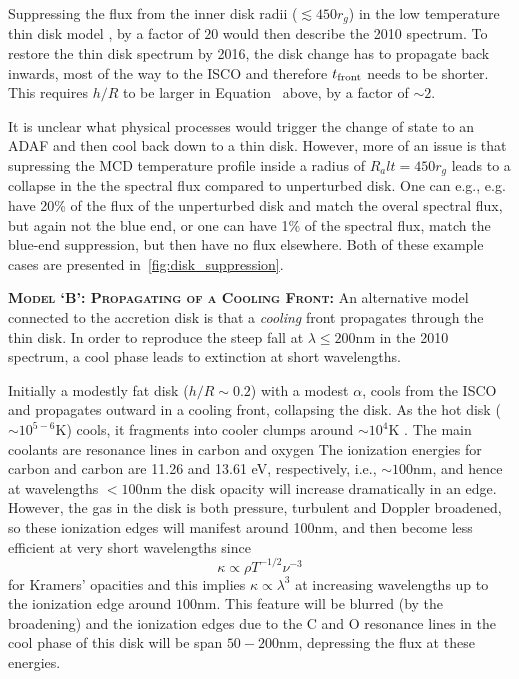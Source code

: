 \documentclass[11pt,a4paper]{article}
\begin{document}
Suppressing the flux from the inner disk radii ($\lesssim 450 r_{g}$)
in the low temperature thin disk model \citep{Narayan1997, Gammie1999,
Agol_Krolik2000, Ashfordi_Paczynski2003, Ford2018}, by a factor of
$20$ would then describe the 2010 spectrum.  To restore the thin disk
spectrum by 2016, the disk change has to propagate back inwards, most
of the way to the ISCO and therefore $t_{\rm front}$ needs to be
shorter. This requires $h/R$ to be larger in
Equation~\label{eqn:t_front} above, by a factor of $\sim 2$.

It is unclear what physical processes would trigger the change of
state to an ADAF and then cool back down to a thin disk. However, more
of an issue is that supressing the MCD temperature profile inside a
radius of $R_alt = 450 r_{g}$ leads to a collapse in the the spectral
flux compared to unperturbed disk. One can e.g., e.g. have 20\% of the
flux of the unperturbed disk and match the overal spectral flux, but
again not the blue end, or one can have 1\% of the spectral flux,
match the blue-end suppression, but then have no flux elsewhere. Both
of these example cases are presented in~\ref{fig:disk_suppression}.


\smallskip \smallskip
\noindent
\textbf{\textsc{Model `B': Propagating of a Cooling Front: }}
An alternative model connected to the accretion disk is that a
\emph{cooling} front propagates through the thin disk.  In order to
reproduce the steep fall at $\lambda \leq 200$nm in the 2010 spectrum,
a cool phase leads to extinction at short wavelengths.

Initially a modestly fat disk ($h/R \sim 0.2$) with a modest $\alpha$,
cools from the ISCO and propagates outward in a cooling front,
collapsing the disk. As the hot disk ($\sim 10^{5-6}$K) cools, it
fragments into cooler clumps around $\sim 10^{4}$K \citep[see e.g.,
][]{McCourt2016}.  The main coolants are resonance lines in carbon and
oxygen \citep[see e.g., Fig. 18 in ][]{Dopita_Sutherland1993} The
ionization energies for carbon and carbon are 11.26 and 13.61 eV,
respectively, i.e., $\sim 100$nm, and hence at wavelengths $<100$nm
the disk opacity will increase dramatically in an edge. However, the
gas in the disk is both pressure, turbulent and Doppler broadened, so
these ionization edges will manifest around 100nm, and then become
less efficient at very short wavelengths since
\begin{equation}
  \kappa \propto \rho T^{-1/2} \nu^{-3}
\end{equation}
for Kramers' opacities and this implies $\kappa \propto \lambda^{3}$
at increasing wavelengths up to the ionization edge around $100$nm.
This feature will be blurred (by the broadening) and the ionization
edges due to the C and O resonance lines in the cool phase of this
disk will be span $50-200$nm, depressing the flux at these energies.
\end{document}
